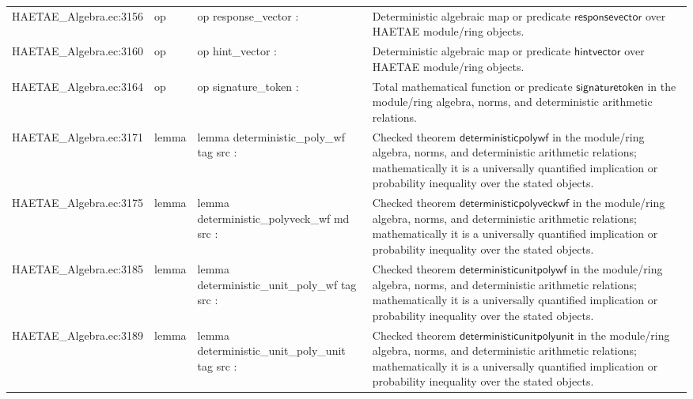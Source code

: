 \documentclass[10pt]{article}
\begin{document}
\begin{longtable}{L{0.11\textwidth}L{0.055\textwidth}L{0.385\textwidth}L{0.41\textwidth}}
HAETAE\_\allowbreak{}Algebra.\allowbreak{}ec:\allowbreak{}3156 & op & {\ttfamily\scriptsize op response\_\allowbreak{}vector :} & Deterministic algebraic map or predicate $\mathsf{responsevector}$ over HAETAE module/ring objects. \\
HAETAE\_\allowbreak{}Algebra.\allowbreak{}ec:\allowbreak{}3160 & op & {\ttfamily\scriptsize op hint\_\allowbreak{}vector :} & Deterministic algebraic map or predicate $\mathsf{hintvector}$ over HAETAE module/ring objects. \\
HAETAE\_\allowbreak{}Algebra.\allowbreak{}ec:\allowbreak{}3164 & op & {\ttfamily\scriptsize op signature\_\allowbreak{}token :} & Total mathematical function or predicate $\mathsf{signaturetoken}$ in the module/ring algebra, norms, and deterministic arithmetic relations. \\
HAETAE\_\allowbreak{}Algebra.\allowbreak{}ec:\allowbreak{}3171 & lemma & {\ttfamily\scriptsize lemma deterministic\_\allowbreak{}poly\_\allowbreak{}wf tag src :} & Checked theorem $\mathsf{deterministicpolywf}$ in the module/ring algebra, norms, and deterministic arithmetic relations; mathematically it is a universally quantified implication or probability inequality over the stated objects. \\
HAETAE\_\allowbreak{}Algebra.\allowbreak{}ec:\allowbreak{}3175 & lemma & {\ttfamily\scriptsize lemma deterministic\_\allowbreak{}polyveck\_\allowbreak{}wf md src :} & Checked theorem $\mathsf{deterministicpolyveckwf}$ in the module/ring algebra, norms, and deterministic arithmetic relations; mathematically it is a universally quantified implication or probability inequality over the stated objects. \\
HAETAE\_\allowbreak{}Algebra.\allowbreak{}ec:\allowbreak{}3185 & lemma & {\ttfamily\scriptsize lemma deterministic\_\allowbreak{}unit\_\allowbreak{}poly\_\allowbreak{}wf tag src :} & Checked theorem $\mathsf{deterministicunitpolywf}$ in the module/ring algebra, norms, and deterministic arithmetic relations; mathematically it is a universally quantified implication or probability inequality over the stated objects. \\
HAETAE\_\allowbreak{}Algebra.\allowbreak{}ec:\allowbreak{}3189 & lemma & {\ttfamily\scriptsize lemma deterministic\_\allowbreak{}unit\_\allowbreak{}poly\_\allowbreak{}unit tag src :} & Checked theorem $\mathsf{deterministicunitpolyunit}$ in the module/ring algebra, norms, and deterministic arithmetic relations; mathematically it is a universally quantified implication or probability inequality over the stated objects. \\

\end{longtable}
\end{document}
